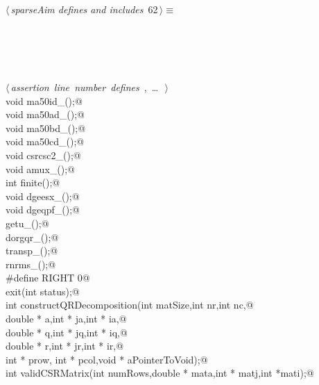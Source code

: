\documentclass{article}
\begin{document}
\begin{flushleft} \small
\begin{minipage}{\linewidth}\label{scrap92}\raggedright\small
{} $\langle\,${\itshape sparseAim defines and includes}\nobreak\ {\footnotesize {62}}$\,\rangle\equiv$
\vspace{-1ex}
\begin{list}{}{} \item
\mbox{}\verb@@\\
\mbox{}\verb@@\\
\mbox{}\verb@@\\
\mbox{}\verb@@\\
\mbox{}\verb@@\hbox{$\langle\,${\itshape assertion line number defines}\nobreak\ {\footnotesize {}, \ldots\ }$\,\rangle$}\verb@@\\
\mbox{}\verb@extern void ma50id_();@\\
\mbox{}\verb@extern void ma50ad_();@\\
\mbox{}\verb@extern void ma50bd_();@\\
\mbox{}\verb@extern void ma50cd_();@\\
\mbox{}\verb@extern void csrcsc2_();@\\
\mbox{}\verb@extern void amux_();@\\
\mbox{}\verb@extern int finite();@\\
\mbox{}\verb@extern void dgeesx_();@\\
\mbox{}\verb@extern void dgeqpf_();@\\
\mbox{}\verb@void getu_();@\\
\mbox{}\verb@void dorgqr_();@\\
\mbox{}\verb@void transp_();@\\
\mbox{}\verb@void rnrms_();@\\
\mbox{}\verb@#define RIGHT 0@\\
\mbox{}\verb@void exit(int status);@\\
\mbox{}\verb@static int constructQRDecomposition(int matSize,int nr,int nc,@\\
\mbox{}\verb@                   double * a,int * ja,int * ia,@\\
\mbox{}\verb@                   double * q,int * jq,int * iq,@\\
\mbox{}\verb@                   double * r,int * jr,int * ir,@\\
\mbox{}\verb@                  int * prow, int * pcol,void * aPointerToVoid);@\\
\mbox{}\verb@static int validCSRMatrix(int numRows,double * mata,int * matj,int *mati);@\\

\end{list}
\end{minipage}
\end{flushleft}
\end{document}
